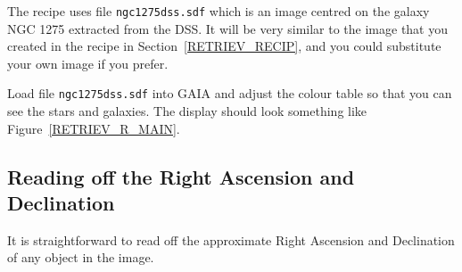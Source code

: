 \documentclass[twoside,11pt]{article}
\begin{document}
The recipe uses file {\tt ngc1275dss.sdf} which is an image centred on
the galaxy NGC 1275 extracted from the DSS.  It will be very similar to
the image that you created in the recipe in Section~\ref{RETRIEV_RECIP},
and you could substitute your own image if you prefer.

Load file {\tt ngc1275dss.sdf} into GAIA and adjust the colour table
so that you can see the stars and galaxies.  The display should look
something like Figure~\ref{RETRIEV_R_MAIN}.

\subsection{Reading off the Right Ascension and Declination}

It is straightforward to read off the approximate Right Ascension and
Declination of any object in the image.
\end{document}
